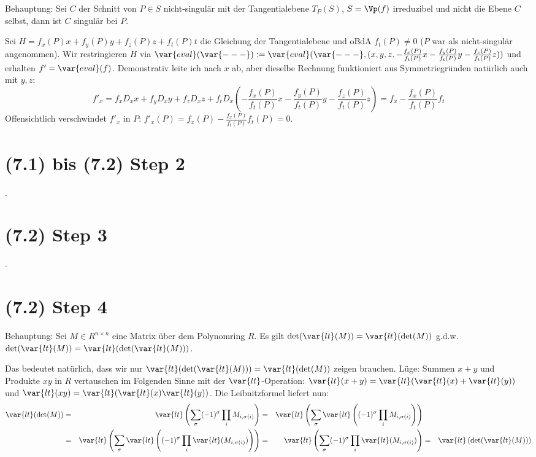 {\LARGE %
Behauptung: Sei $C$ der Schnitt von $P \in S$ nicht-singulär mit der Tangentialebene $T_P(S)$, $S = \Vp(f)$ irreduzibel und nicht die Ebene $C$ selbst, dann ist $C$ singulär bei $P$.
} %

Sei $H = f_x(P)x + f_y(P)y + f_z(P)z + f_t(P)t$ die Gleichung der Tangentialebene und oBdA $f_t(P) \neq 0$ ($P$ war als nicht-singulär angenommen).
Wir restringieren $H$ via $\var{eval}(\var{---}) := \var{eval}(\var{---},(x,y,z,-\frac{f_x(P)}{f_t(P)}x-\frac{f_y(P)}{f_t(P)}y-\frac{f_z(P)}{f_t(P)}z))$ und erhalten
$f' = \var{eval}(f)$. Demonstrativ leite ich nach $x$ ab, aber dieselbe Rechnung funktioniert aus Symmetriegründen natürlich auch mit $y,z$:
\begin{equation}
f'_x = f_x D_xx + f_y D_x y + f_z D_x z + f_t D_x (-\frac{f_x(P)}{f_t(P)}x-\frac{f_y(P)}{f_t(P)}y-\frac{f_z(P)}{f_t(P)}z) = f_x - \frac{f_x(P)}{f_t(P)} f_t
\end{equation}
Offensichtlich verschwindet $f'_x$ in $P$: $f'_x(P) = f_x(P) - \frac{f_x(P)}{f_t(P)} f_t(P) = 0$.
\section{(7.1) bis (7.2) Step 2} .
\section{(7.2) Step 3} .
\section{(7.2) Step 4}

{\LARGE %
Behauptung: Sei $M \in R^{n\times n}$ eine Matrix über dem Polynomring $R$.
Es gilt $\det(\var{lt}(M)) = \var{lt}(\det(M))$ g.d.w. $\det(\var{lt}(M)) = \var{lt}(\det(\var{lt}(M)))$.
} %

Das bedeutet natürlich, dass wir nur $\var{lt}(\det(\var{lt}(M))) = \var{lt}(\det(M))$ zeigen brauchen.
Lüge: Summen $x+y$ und Produkte $xy$ in $R$ vertauschen im Folgenden Sinne mit der $\var{lt}$-Operation: $\var{lt}(x+y) = \var{lt}(\var{lt}(x) + \var{lt}(y))$ und $\var{lt}(xy) = \var{lt}(\var{lt}(x)\var{lt}(y))$.
Die Leibnitzformel liefert nun:
\begin{align*}
  \var{lt}(\det(M))
&= &\var{lt}\left(\sum_\sigma (-1)^\sigma \prod_i M_{i,\sigma(i)}\right)
&= &\var{lt}\left(\sum_\sigma \var{lt}\left((-1)^\sigma \prod_i M_{i,\sigma(i)}\right)\right)
& &
\\
&= &\var{lt}\left(\sum_\sigma \var{lt}\left((-1)^\sigma \prod_i \var{lt}(M_{i,\sigma(i)})\right)\right)
&= &\var{lt}\left(\sum_\sigma (-1)^\sigma \prod_i \var{lt}(M_{i,\sigma(i)})\right)
&= &\var{lt}\left(\det(\var{lt}(M))\right)
\end{align*}
